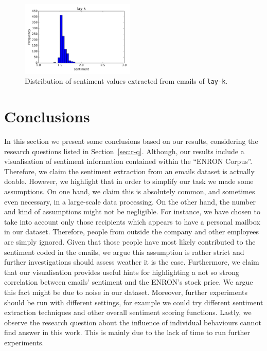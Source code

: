\documentclass{vldb}
\begin{document}
\begin{figure}[h!]
\centering
\includegraphics[width=0.48\textwidth]{imgs/hist/sentiment_vs_stock_lay-k_hist.pdf}
\caption{Distribution of sentiment values extracted from emails of \texttt{lay-k}.}
\label{fig:sentiment_dist_hist_lay}
\end{figure}


\section{Conclusions}
\label{sec:concl}
In this section we present some conclusions based on our results, considering the research questions listed in Section~\ref{sec:r-q}.
Although, our results include a visualisation of sentiment information contained within the ``ENRON Corpus''.
Therefore, we claim the sentiment extraction from an emails dataset is actually doable. 
However, we highlight that in order to simplify our task we made some assumptions.
On one hand, we claim this is absolutely common, and sometimes even necessary, in a large-scale data processing.
On the other hand, the number and kind of assumptions might not be negligible.
For instance, we have chosen to take into account only those recipients which appears to have a personal mailbox in our dataset.
Therefore, people from outside the company and other employees are simply ignored.
Given that those people have most likely contributed to the sentiment coded in the emails, we argue this assumption is rather strict and further investigations should assess weather it is the case.  
Furthermore, we claim that our visualisation provides useful hints for highlighting a not so strong correlation between emails' sentiment and the ENRON's stock price.
We argue this fact might be due to noise in our dataset.
Moreover, further experiments should be run with different settings, for example we could try different sentiment extraction techniques and other overall sentiment scoring functions.
Lastly, we observe the research question about the influence of individual behaviours cannot find answer in this work.
This is mainly due to the lack of time to run further experiments.
\end{document}
